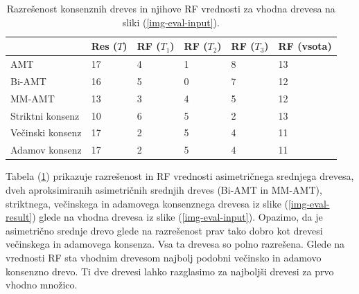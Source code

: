 \documentclass[a4paper, 12pt]{book}
\begin{document}
\begin{table}
	\begin{center}
	{\footnotesize
	\begin{tabular}{ l| l | l | l | l | l }
	~                & Res ($T$) & RF ($T_1$) & RF ($T_2$) & RF ($T_3$) & RF (vsota) \\ \hline
	AMT              & 17          & 4             & 1             & 8             & 13         \\ \hline
	Bi-AMT           & 16          & 5             & 0             & 7             & 12         \\ \hline
	MM-AMT           & 13          & 3             & 4             & 5             & 12         \\ \hline
	Striktni konsenz & 10          & 6             & 5             & 2             & 13         \\ \hline
	Večinski konsenz & 17          & 2             & 5             & 4             & 11         \\ \hline
	Adamov konsenz   & 17          & 2             & 5             & 4             & 11         \\ \hline
	\end{tabular}
	\caption{Razrešenost konsenznih dreves in njihove RF vrednosti za vhodna drevesa na sliki (\ref{img-eval-input}).}
	}
	\label{table-eval-1}
	\end{center}		
\end{table}

Tabela (\ref{table-eval-1}) prikazuje razrešenost in RF vrednosti asimetričnega srednjega drevesa, dveh aproksimiranih asimetričnih srednjih dreves (Bi-AMT in MM-AMT), striktnega, večinskega in adamovega konsenznega drevesa iz slike (\ref{img-eval-result}) glede na vhodna drevesa iz slike (\ref{img-eval-input}). Opazimo, da je asimetrično srednje drevo glede na razrešenost prav tako dobro kot drevesi večinskega in adamovega konsenza. Vsa ta drevesa so polno razrešena. Glede na vrednosti RF sta vhodnim drevesom najbolj podobni večinsko in adamovo konsenzno drevo. Ti dve drevesi lahko razglasimo za najboljši drevesi za prvo vhodno množico.
\end{document}
